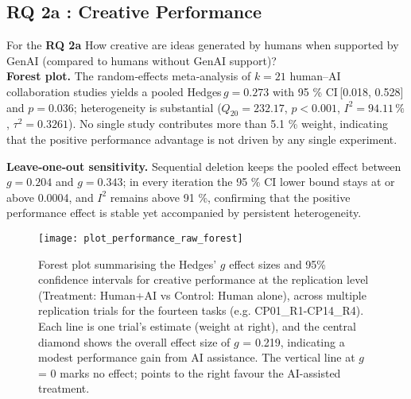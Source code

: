 \documentclass[manuscript, screen, review, acmsmall, anonymous]{acmart}
\begin{document}
\subsection{RQ 2a : Creative Performance}
\label{sec:CreativePerformance}
For the \textbf{RQ 2a} How creative are ideas generated by humans when supported by GenAI (compared to humans without GenAI support)?  \\

\textbf{Forest plot.} The random‑effects meta‑analysis of $k=21$ human–AI collaboration studies yields a pooled Hedges\,$g = 0.273$ with 95 \% CI\,[0.018, 0.528] and $p = 0.036$; heterogeneity is substantial ($Q_{20}=232.17$, $p<0.001$, $I^{2}=94.11\,\%$, $\tau^{2}=0.3261$). No single study contributes more than 5.1 \% weight, indicating that the positive performance advantage is not driven by any single experiment. 

\textbf{Leave‑one‑out sensitivity.} Sequential deletion keeps the pooled effect between $g = 0.204$ and $g = 0.343$; in every iteration the 95 \% CI lower bound stays at or above 0.0004, and $I^{2}$ remains above 91 \%, confirming that the positive performance effect is stable yet accompanied by persistent heterogeneity.
\begin{figure}[H]
  \centering
  \texttt{[image: plot\_performance\_raw\_forest]}
  \caption{Forest plot summarising the Hedges' $g$ effect sizes and 95\% confidence intervals for creative performance at the replication level (Treatment: Human+AI vs Control: Human alone), across multiple replication trials for the fourteen tasks (e.g. CP01\_R1-CP14\_R4). Each line is one trial's estimate (weight at right), and the central diamond shows the overall effect size of $g$ = 0.219, indicating a modest performance gain from AI assistance. The vertical line at $g$ = 0 marks no effect; points to the right favour the AI-assisted treatment.}
  \label{fig:performance_raw_forest}
\end{figure}
\end{document}
